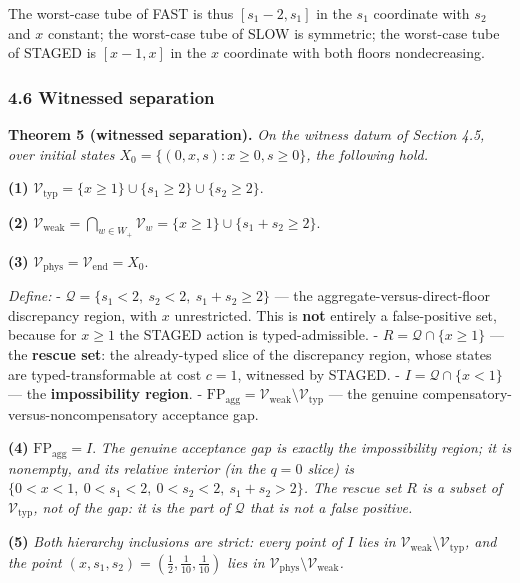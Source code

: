 \documentclass[11pt]{article}
\begin{document}
The worst-case tube of FAST is thus \([s_1 - 2, s_1]\) in the \(s_1\)
coordinate with \(s_2\) and \(x\) constant; the worst-case tube of SLOW
is symmetric; the worst-case tube of STAGED is \([x - 1, x]\) in the
\(x\) coordinate with both floors nondecreasing.

\subsubsection{4.6 Witnessed separation}\label{witnessed-separation}

\textbf{Theorem 5 (witnessed separation).} \emph{On the witness datum of
Section 4.5, over initial states
\(X_0 = \{(0, x, s) : x \ge 0, s \ge 0\}\), the following hold.}

\textbf{(1)}
\(\mathcal{V}_{\mathrm{typ}} = \{ x \ge 1 \} \cup \{ s_1 \ge 2 \} \cup \{ s_2 \ge 2 \}.\)

\textbf{(2)}
\(\mathcal{V}_{\mathrm{weak}} = \bigcap_{w \in W_+} \mathcal{V}_w = \{ x \ge 1 \} \cup \{ s_1 + s_2 \ge 2 \}.\)

\textbf{(3)}
\(\mathcal{V}_{\mathrm{phys}} = \mathcal{V}_{\mathrm{end}} = X_0.\)

\emph{Define:} -
\(\mathcal{Q} = \{ s_1 < 2,\ s_2 < 2,\ s_1 + s_2 \ge 2 \}\) --- the
aggregate-versus-direct-floor discrepancy region, with \(x\)
unrestricted. This is \textbf{not} entirely a false-positive set,
because for \(x \ge 1\) the STAGED action is typed-admissible. -
\(R = \mathcal{Q} \cap \{ x \ge 1 \}\) --- the \textbf{rescue set}: the
already-typed slice of the discrepancy region, whose states are typed-transformable at cost \(c = 1\), witnessed by STAGED. -
\(I = \mathcal{Q} \cap \{ x < 1 \}\) --- the \textbf{impossibility
region}. -
\(\mathrm{FP}_{\mathrm{agg}} = \mathcal{V}_{\mathrm{weak}} \setminus \mathcal{V}_{\mathrm{typ}}\)
--- the genuine compensatory-versus-noncompensatory acceptance gap.

\textbf{(4)} \(\mathrm{FP}_{\mathrm{agg}} = I.\) \emph{The genuine
acceptance gap is exactly the impossibility region; it is nonempty, and
its relative interior (in the \(q = 0\) slice) is
\(\{ 0 < x < 1,\ 0 < s_1 < 2,\ 0 < s_2 < 2,\ s_1 + s_2 > 2 \}\). The
rescue set \(R\) is a subset of \(\mathcal{V}_{\mathrm{typ}}\), not of
the gap: it is the part of \(\mathcal{Q}\) that is not a false
positive.}

\textbf{(5)} \emph{Both hierarchy inclusions are strict: every point of
\(I\) lies in
\(\mathcal{V}_{\mathrm{weak}} \setminus \mathcal{V}_{\mathrm{typ}}\),
and the point \((x, s_1, s_2) = (\tfrac12, \tfrac1{10}, \tfrac1{10})\)
lies in
\(\mathcal{V}_{\mathrm{phys}} \setminus \mathcal{V}_{\mathrm{weak}}\).}
\end{document}

